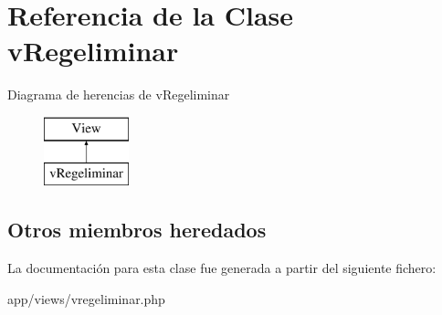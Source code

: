 \hypertarget{classv_regeliminar}{}\section{Referencia de la Clase v\+Regeliminar}
\label{classv_regeliminar}
Diagrama de herencias de v\+Regeliminar\begin{figure}[H]
\begin{center}
\leavevmode
\includegraphics[height=2.000000cm]{classv_regeliminar}
\end{center}
\end{figure}
\subsection*{Otros miembros heredados}


La documentación para esta clase fue generada a partir del siguiente fichero\+:\begin{DoxyCompactItemize}
\item 
app/views/vregeliminar.\+php\end{DoxyCompactItemize}
